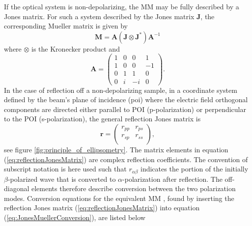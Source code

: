 If the optical system is non-depolarizing, the MM may be fully described by a Jones matrix. For such a system described by the Jones matrix $\mathbf{J}$, the corresponding Mueller matrix is given by \cite{hans_arwin}
\begin{equation}
    \mathbf{M} = \mathbf{A}(\mathbf{J}\otimes\mathbf{J}^*)\mathbf{A}^{-1}
    \label{eq:JonesMuellerConversion}
\end{equation}
where $\otimes$ is the Kronecker product and 
\begin{equation}
    \mathbf{A} = 
    \begin{pmatrix}
        1 & 0 & 0 & 1 \\
        1 & 0 & 0 & -1 \\
        0 & 1 & 1 & 0 \\
        0 & i & -i & 0
    \end{pmatrix}.
\end{equation}
In the case of reflection off a non-depolarizing sample, in a coordinate system defined by the beam's plane of incidence (\ac{poi}) where the electric field orthogonal components are directed either parallel to POI (p-polarization) or perpendicular to the POI (s-polarization), the general reflection Jones matrix is
\begin{equation}
    \mathbf{r} = 
    \begin{pmatrix}
        r_{pp}  &   r_{ps}  \\
        r_{sp}  &   r_{ss}  \\
    \end{pmatrix},
    \label{eq:reflectionJonesMatrix}
\end{equation} %
see figure \ref{fig:principle_of_ellipsometry}. The matrix elements in equation (\ref{eq:reflectionJonesMatrix}) are complex reflection coefficients. The convention of subscript notation is here used such that $r_{\alpha\beta}$ indicates the portion of the initially $\beta$-polarized wave that is converted to $\alpha$-polarization after reflection. The off-diagonal elements therefore describe conversion between the two polarization modes. Conversion equations for the equivalent MM \cite{hauge}, found by inserting the reflection Jones matrix (\ref{eq:reflectionJonesMatrix}) into equation (\ref{eq:JonesMuellerConversion}), are listed below
